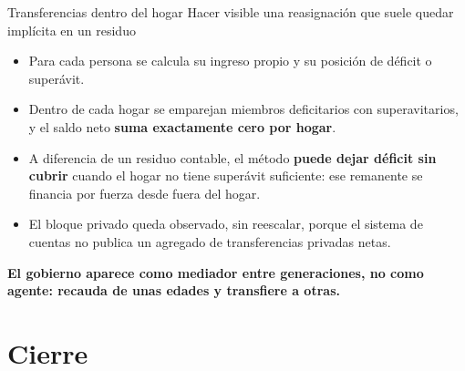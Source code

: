 \documentclass[aspectratio=169,11pt]{beamer}
\newcommand{\bajada}[1]{{\small\textcolor{gris}{#1}}\vspace{0.5em}}
\newcommand{\cierre}[1]{%
  \vfill{\small\textcolor{acento}{\textbf{#1}}}}
\begin{document}
\begin{frame}{Transferencias dentro del hogar}
\bajada{Hacer visible una reasignación que suele quedar implícita en un residuo}

\begin{itemize}\itemsep0.5em
  \item Para cada persona se calcula su ingreso propio y su posición de déficit o superávit.
  \item Dentro de cada hogar se emparejan miembros deficitarios con superavitarios, y el saldo
        neto \textbf{suma exactamente cero por hogar}.
  \item A diferencia de un residuo contable, el método \textbf{puede dejar déficit sin cubrir}
        cuando el hogar no tiene superávit suficiente: ese remanente se financia por fuerza desde
        fuera del hogar.
  \item El bloque privado queda observado, sin reescalar, porque el sistema de cuentas no publica
        un agregado de transferencias privadas netas.
\end{itemize}

\cierre{El gobierno aparece como mediador entre generaciones, no como agente: recauda de unas
edades y transfiere a otras.}
\end{frame}

\section{Cierre}
\end{document}
